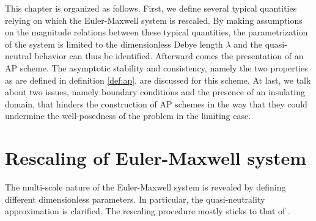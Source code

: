 \documentclass{report}
\begin{document}
This chapter is organized as follows. First, we define several typical quantities relying on which the Euler-Maxwell system is rescaled. By making assumptions on the magnitude relations between these typical quantities, the parametrization of the system is limited to the dimensionless Debye length $\lambda$ and the quasi-neutral behavior can thus be identified. Afterward comes the presentation of an AP scheme. The asymptotic stability and consistency, namely the two properties as are defined in definition \ref{def:ap}, are discussed for this scheme. At last, we talk about two issues, namely boundary conditions and the presence of an insulating domain, that hinders the construction of AP schemes in the way that they could undermine the well-posedness of the problem in the limiting case.  

\section{Rescaling of Euler-Maxwell system} \label{sec:rescaling}
The multi-scale nature of the Euler-Maxwell system is revealed by defining different dimensionless parameters. In particular, the quasi-neutrality approximation is clarified. The rescaling procedure mostly sticks to that of \cite{degond_2017}.
\end{document}
